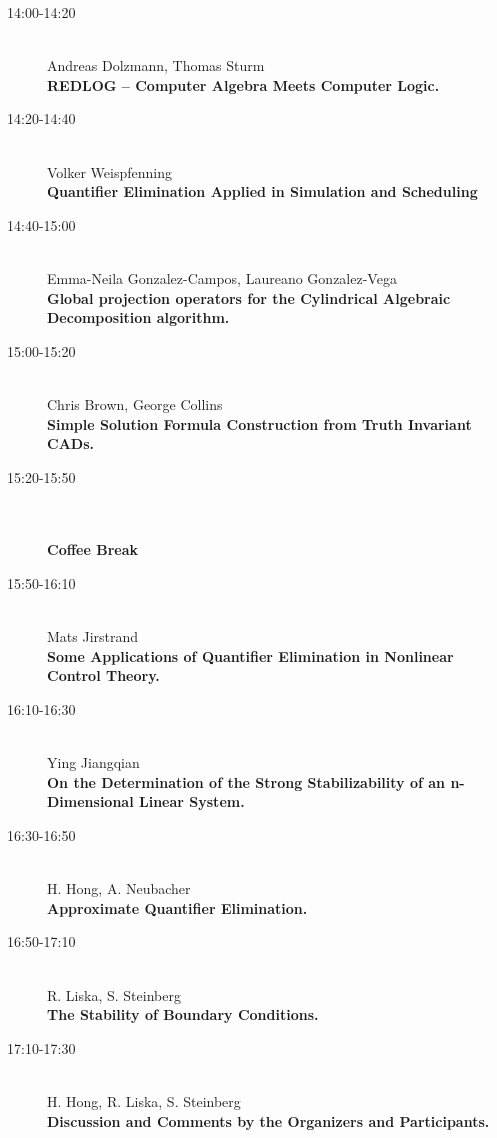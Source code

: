\begin{description}
\item[14:00-14:20] \ \\
  Andreas Dolzmann, Thomas Sturm\\
  {\bf REDLOG -- Computer Algebra Meets Computer Logic.} 
\item[14:20-14:40] \ \\
  Volker Weispfenning\\
  {\bf Quantifier Elimination Applied in Simulation and Scheduling} 
\item[14:40-15:00] \ \\
  Emma-Neila Gonzalez-Campos, Laureano Gonzalez-Vega\\
  {\bf Global projection operators for the Cylindrical Algebraic Decomposition algorithm.} 
\item[15:00-15:20] \ \\
  Chris Brown, George Collins\\
  {\bf Simple Solution Formula Construction from Truth Invariant CADs.} 
\item[15:20-15:50] \ \\
  \\
  {\bf Coffee Break} 
\item[15:50-16:10] \ \\
  Mats Jirstrand\\
  {\bf Some Applications of Quantifier Elimination in Nonlinear
    Control Theory.} 
\item[16:10-16:30] \ \\
  Ying Jiangqian\\
  {\bf On the Determination of the Strong Stabilizability of an
    n-Dimensional Linear System.} 
\item[16:30-16:50] \ \\
  H. Hong, A. Neubacher\\
  {\bf Approximate Quantifier Elimination.} 
\item[16:50-17:10] \ \\
  R. Liska, S. Steinberg\\
  {\bf The Stability of Boundary Conditions.} 
\item[17:10-17:30] \ \\
  H. Hong, R. Liska, S. Steinberg\\
  {\bf Discussion and Comments by the Organizers and Participants. } 
\end{description}


